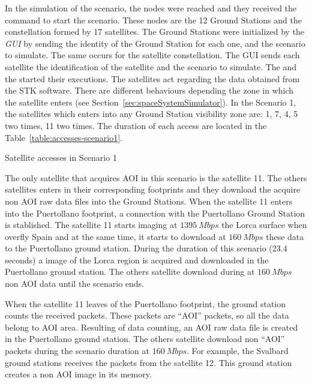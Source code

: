 In the simulation of the scenario, the \vw nodes were reached and they received
the command to start the scenario. These nodes are the 12 Ground Stations and
the constellation formed by 17 satellites. The Ground Stations were initialized by
the \emph{GUI} by sending the identity of the Ground Station for each one, and
the scenario to simulate. 
The same occurs for the satellite constellation. The \ac{GUI} sends each satellite the
identification of the satellite and the scenario to simulate.
 The \satss and the \gsss started their executions. The satellites act regarding the data obtained from the \ac{STK} software. 
There are different behaviours depending the zone in which the satellite enters (see
Section~\ref{sec:spaceSystemSimulator}). In the Scenario 1, the satellites which
enters into any Ground Station visibility zone are: 1, 7, 4, 5 two times, 11 two
times. The duration of each access are located in the Table~\ref{table:accesses-scenario1}.
\begin{table}[!h]
  \centering
  {\small
  
  }
  \caption{Satellite accesses in Scenario 1}
  \label{table:accesses-scenario1}
\end{table}

The only satellite that acquires \ac{AOI} in this scenario is the satellite
11. The others satellites enters in their corresponding footprints and they
download the acquire non \ac{AOI} raw data files into the Ground Stations. When the satellite 11 enters into the Puertollano footprint, a connection with
the Puertollano Ground Station is stablished. The satellite
11 starts imaging at $1395~Mbps$ the Lorca surface when overfly Spain and at the same time, it
starts to download at $160~Mbps$ these data to the Puertollano ground station. During the
duration of this scenario (23.4 seconds) a image of the Lorca region is
acquired and downloaded in the Puertollano ground station. The others satellite
download during at $160~Mbps$ non \ac{AOI} data until the scenario ends. 

When the satellite 11 leaves of the Puertollano footprint, the ground station
counts the received packets. These packets are ``AOI'' packets, so all the data
belong to \ac{AOI} area. Resulting of data counting, an \ac{AOI} raw data file is created in the
Puertollano ground station. 
The others satellite download non ``AOI'' packets during the scenario duration
at $160~Mbps$. For example, the Svalbard ground stations receives the packets
from the satellite 12. This ground station creates a non \ac{AOI} image in its
memory.

